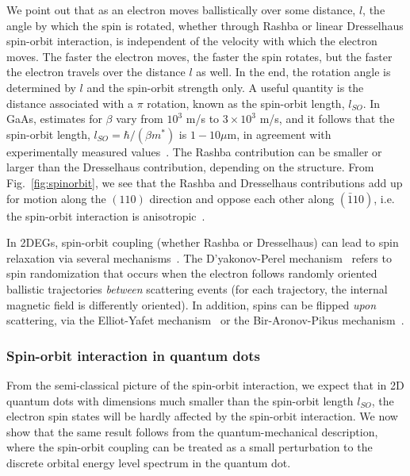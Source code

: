 \documentclass[12pt,aps,nofootinbib]{revtex4-1}
\begin{document}
We point out that as an electron moves ballistically over some
distance, $l$, the angle by which the spin is rotated, whether
through Rashba or linear Dresselhaus spin-orbit interaction, is
independent of the velocity with which the electron moves. The
faster the electron moves, the faster the spin rotates, but the
faster the electron travels over the distance $l$ as well. In the
end, the rotation angle is determined by $l$ and the spin-orbit
strength only. A useful quantity is the distance associated with a
$\pi$ rotation, known as the spin-orbit length, $l_{SO}$. In GaAs,
estimates for $\beta$ vary from $10^3$ m/s to $3\times 10^3$ m/s,
and it follows that the spin-orbit length, $l_{SO} = \hbar /
(\beta m^*)$ is $1-10 \mu$m, in agreement with experimentally
measured values~\cite{zumbuhl02}. The Rashba contribution can be
smaller or larger than the Dresselhaus contribution, depending on
the structure. From Fig.~\ref{fig:spinorbit}, we see that the
Rashba and Dresselhaus contributions add up for motion along
the $(110)$ direction and oppose each other along $(\bar{1}10)$, i.e. 
the spin-orbit interaction is anisotropic~\cite{Haug05}.

In 2DEGs, spin-orbit coupling (whether Rashba or Dresselhaus) can lead to spin relaxation via several mechanisms~\cite{zutic04}. The D'yakonov-Perel mechanism~\cite{dyakonov71,wrinkler03} refers to spin randomization that occurs when the electron follows randomly oriented ballistic trajectories \emph{between} scattering events (for each trajectory, the internal magnetic field is differently oriented). In addition, spins can be flipped \emph{upon} scattering, via the Elliot-Yafet mechanism~\cite{elliott54,yafet63} or the Bir-Aronov-Pikus mechanism~\cite{bir75}.


\subsubsection{Spin-orbit interaction in quantum dots}

From the semi-classical picture of the spin-orbit interaction, we
expect that in 2D quantum dots with dimensions much smaller than
the spin-orbit length $l_{SO}$, the electron spin states will be
hardly affected by the spin-orbit interaction. We now show that the same result follows from the quantum-mechanical description, where the
spin-orbit coupling can be treated as a small perturbation to the
discrete orbital energy level spectrum in the quantum dot.
\end{document}

